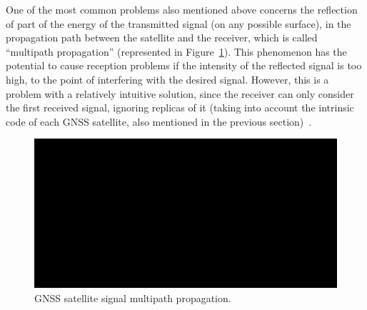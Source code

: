 One of the most common problems also mentioned above concerns the reflection of part of the energy of the transmitted signal (on any possible surface), in the propagation path between the satellite and the receiver, which is called ``multipath propagation'' (represented in Figure~\ref{fig:multipath}). This phenomenon has the potential to cause reception problems if the intensity of the reflected signal is too high, to the point of interfering with the desired signal. However, this is a problem with a relatively intuitive solution, since the receiver can only consider the first received signal, ignoring replicas of it (taking into account the intrinsic code of each GNSS satellite, also mentioned in the previous section)~\cite{novatel_gnss,kaplan_2017}.

\begin{figure}[ht]
	\centering
	\includegraphics[width=1.0\textwidth]{Chapters/Figures/demo.png}
	\caption{GNSS satellite signal multipath propagation.}
	\label{fig:multipath}
\end{figure}


